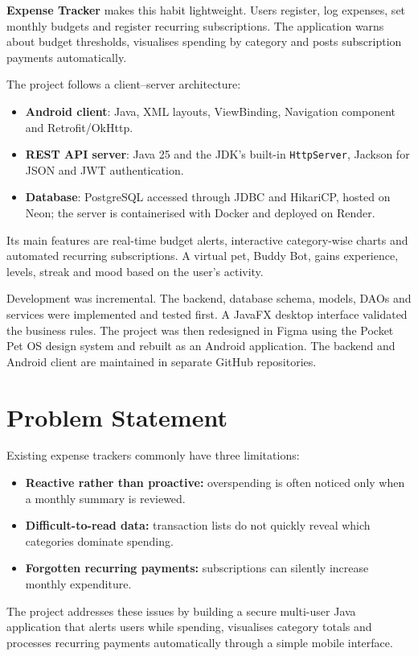 \documentclass[12pt,a4paper]{report}
\begin{document}
\textbf{Expense Tracker} makes this habit lightweight. Users register, log expenses, set monthly budgets and register recurring subscriptions. The application warns about budget thresholds, visualises spending by category and posts subscription payments automatically.

The project follows a client--server architecture:
\begin{itemize}
\item \textbf{Android client}: Java, XML layouts, ViewBinding, Navigation component and Retrofit/OkHttp.
\item \textbf{REST API server}: Java 25 and the JDK's built-in \texttt{HttpServer}, Jackson for JSON and JWT authentication.
\item \textbf{Database}: PostgreSQL accessed through JDBC and HikariCP, hosted on Neon; the server is containerised with Docker and deployed on Render.
\end{itemize}
Its main features are real-time budget alerts, interactive category-wise charts and automated recurring subscriptions. A virtual pet, Buddy Bot, gains experience, levels, streak and mood based on the user's activity.

Development was incremental. The backend, database schema, models, DAOs and services were implemented and tested first. A JavaFX desktop interface validated the business rules. The project was then redesigned in Figma using the Pocket Pet OS design system and rebuilt as an Android application. The backend and Android client are maintained in separate GitHub repositories.

\newpage
\section{Problem Statement}
Existing expense trackers commonly have three limitations:
\begin{itemize}
\item \textbf{Reactive rather than proactive:} overspending is often noticed only when a monthly summary is reviewed.
\item \textbf{Difficult-to-read data:} transaction lists do not quickly reveal which categories dominate spending.
\item \textbf{Forgotten recurring payments:} subscriptions can silently increase monthly expenditure.
\end{itemize}
The project addresses these issues by building a secure multi-user Java application that alerts users while spending, visualises category totals and processes recurring payments automatically through a simple mobile interface.
\end{document}
